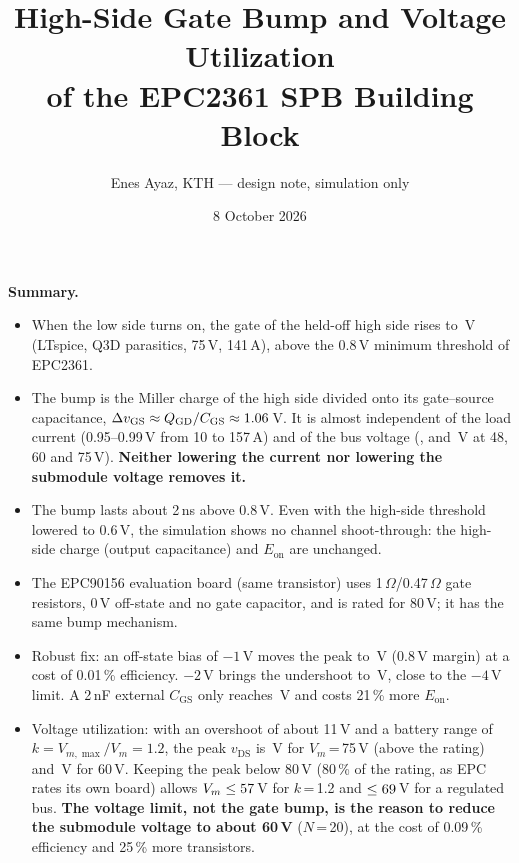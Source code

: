 \documentclass[10pt,a4paper]{article}
\title{\textbf{High-Side Gate Bump and Voltage Utilization\\of the EPC2361 SPB Building Block}}
\author{Enes Ayaz, KTH --- design note, simulation only}
\date{8 October 2026}
\begin{document}
\maketitle

\noindent\colorbox{box}{\parbox{\dimexpr\linewidth-2\fboxsep}{\small
\textbf{Summary.}
\begin{itemize}\itemsep0pt
\item When the low side turns on, the gate of the held-off high side rises to \BmpSeventyFive\,V (LTspice, Q3D parasitics, 75\,V, 141\,A), above the 0.8\,V minimum threshold of EPC2361.
\item The bump is the Miller charge of the high side divided onto its gate--source capacitance, $\Delta v_\mathrm{GS}\approx Q_\mathrm{GD}/C_\mathrm{GS}\approx1.06$\,V. It is almost independent of the load current (0.95--0.99\,V from 10 to 157\,A) and of the bus voltage (\BmpFortyEight, \BmpSixty{} and \BmpSeventyFive\,V at 48, 60 and 75\,V). \textbf{Neither lowering the current nor lowering the submodule voltage removes it.}
\item The bump lasts about 2\,ns above 0.8\,V. Even with the high-side threshold lowered to 0.6\,V, the simulation shows no channel shoot-through: the high-side charge (output capacitance) and $E_\mathrm{on}$ are unchanged.
\item The EPC90156 evaluation board (same transistor) uses 1\,$\Omega$/0.47\,$\Omega$ gate resistors, 0\,V off-state and no gate capacitor, and is rated for 80\,V; it has the same bump mechanism.
\item Robust fix: an off-state bias of $-1$\,V moves the peak to \BmpNegOneSF\,V (0.8\,V margin) at a cost of 0.01\,\% efficiency. $-2$\,V brings the undershoot to \VgsMinNegTwo\,V, close to the $-4$\,V limit. A 2\,nF external $C_\mathrm{GS}$ only reaches \BmpCTwoSF\,V and costs 21\,\% more $E_\mathrm{on}$.
\item Voltage utilization: with an overshoot of about 11\,V and a battery range of $k=V_{m,\max}/V_m=1.2$, the peak $v_\mathrm{DS}$ is \VpkSFk\,V for $V_m$\,=\,75\,V (above the rating) and \VpkSixk\,V for 60\,V. Keeping the peak below 80\,V (80\,\% of the rating, as EPC rates its own board) allows $V_m\le57$\,V for $k$\,=\,1.2 and $\le69$\,V for a regulated bus. \textbf{The voltage limit, not the gate bump, is the reason to reduce the submodule voltage to about 60\,V} ($N$\,=\,20), at the cost of 0.09\,\% efficiency and 25\,\% more transistors.
\end{itemize}}}
\end{document}
